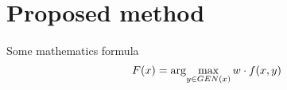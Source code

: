 \chapter{Proposed method}

Some mathematics formula $$F(x) = \arg\!\max_{y \in GEN(x)} w \cdot f(x, y)$$